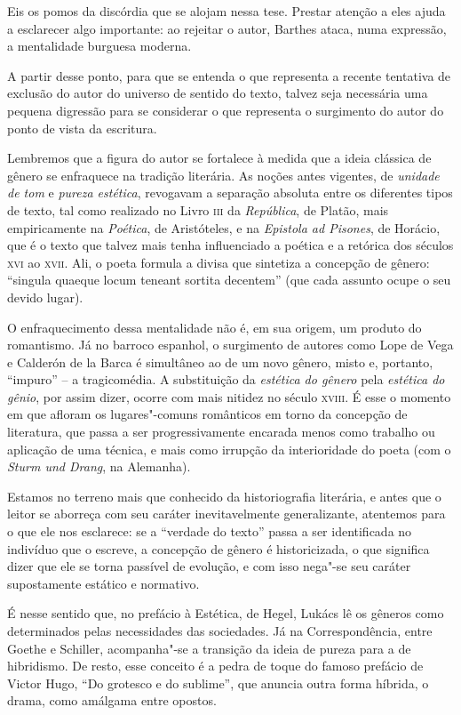 Eis os pomos da discórdia que se alojam nessa tese. Prestar atenção a
eles ajuda a esclarecer algo importante: ao rejeitar o autor, Barthes
ataca, numa expressão, a mentalidade burguesa moderna.

A partir desse ponto, para que se entenda o que representa a recente
tentativa de exclusão do autor do universo de sentido do texto, talvez
seja necessária uma pequena digressão para se considerar o que
representa o surgimento do autor do ponto de vista da escritura.

Lembremos que a figura do autor se fortalece à medida que a ideia
clássica de gênero se enfraquece na tradição literária. As noções antes
vigentes, de \emph{unidade de tom} e \emph{pureza estética}, revogavam a separação
absoluta entre os diferentes tipos de texto, tal como realizado no Livro
\textsc{iii} da \emph{República}, de Platão, mais empiricamente na \emph{Poética}, de
Aristóteles, e na \emph{Epistola ad Pisones}, de Horácio, que é o texto que
talvez mais tenha influenciado a poética e a retórica dos séculos
\textsc{xvi} ao \textsc{xvii}. Ali, o poeta formula a divisa que
sintetiza a concepção de gênero: ``singula quaeque locum teneant sortita
decentem'' (que cada assunto ocupe o seu devido lugar).

O enfraquecimento dessa mentalidade não é, em sua origem, um produto do
romantismo. Já no barroco espanhol, o surgimento de autores como Lope de
Vega e Calderón de la Barca é simultâneo ao de um novo gênero, misto e,
portanto, ``impuro'' -- a tragicomédia. A substituição da \emph{estética do
gênero} pela \emph{estética do gênio}, por assim dizer, ocorre com mais nitidez
no século \textsc{xviii}. É esse o momento em que afloram os
lugares"-comuns românticos em torno da concepção de literatura, que passa
a ser progressivamente encarada menos como trabalho ou aplicação de uma
técnica, e mais como irrupção da interioridade do poeta (com o \emph{Sturm und
Drang}, na Alemanha).

Estamos no terreno mais que conhecido da historiografia literária, e
antes que o leitor se aborreça com seu caráter inevitavelmente
generalizante, atentemos para o que ele nos esclarece: se a ``verdade do
texto'' passa a ser identificada no indivíduo que o escreve, a concepção
de gênero é historicizada, o que significa dizer que ele se torna
passível de evolução, e com isso nega"-se seu caráter supostamente
estático e normativo.

É nesse sentido que, no prefácio à Estética, de Hegel, Lukács lê os
gêneros como determinados pelas necessidades das sociedades. Já na
Correspondência, entre Goethe e Schiller, acompanha"-se a transição da
ideia de pureza para a de hibridismo. De resto, esse conceito é a pedra
de toque do famoso prefácio de Victor Hugo, ``Do grotesco e do
sublime'', que anuncia outra forma híbrida, o drama, como amálgama entre
opostos.


